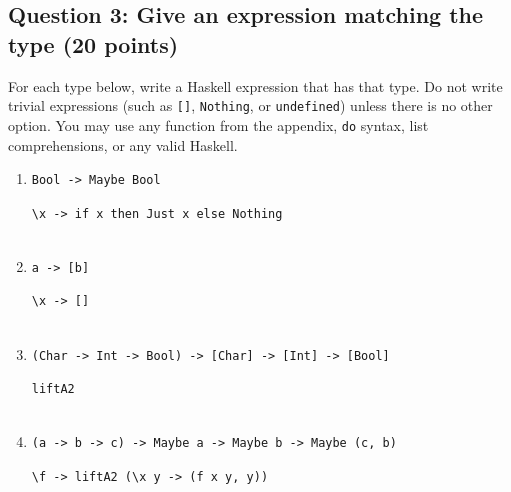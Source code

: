 \documentclass[11pt]{article}
\begin{document}
\subsection*{Question 3: Give an expression matching the type (20 points)}
For each type below, write a Haskell expression that has that type.
Do not write trivial expressions (such as \texttt{[]}, \texttt{Nothing},
or \texttt{undefined}) unless there is no other option. You may use any
function from the appendix, \texttt{do} syntax, list comprehensions,
or any valid Haskell.

\begin{enumerate}
\item
\begin{minipage}[t]{\linewidth}
\vspace{-\baselineskip}
\begin{lstlisting}
Bool -> Maybe Bool
\end{lstlisting}
\begin{lstlisting}[style=answer]
\x -> if x then Just x else Nothing


\end{lstlisting}
\end{minipage}

\item
\begin{minipage}[t]{\linewidth}
\vspace{-\baselineskip}
\begin{lstlisting}
a -> [b]
\end{lstlisting}
\begin{lstlisting}[style=answer]
\x -> []


\end{lstlisting}
\end{minipage}

\item
\begin{minipage}[t]{\linewidth}
\vspace{-\baselineskip}
\begin{lstlisting}
(Char -> Int -> Bool) -> [Char] -> [Int] -> [Bool]
\end{lstlisting}
\begin{lstlisting}[style=answer]
liftA2


\end{lstlisting}
\end{minipage}

\item
\begin{minipage}[t]{\linewidth}
\vspace{-\baselineskip}
\begin{lstlisting}
(a -> b -> c) -> Maybe a -> Maybe b -> Maybe (c, b)
\end{lstlisting}
\begin{lstlisting}[style=answer]
\f -> liftA2 (\x y -> (f x y, y))



\end{lstlisting}
\end{minipage}
\end{enumerate}
\end{document}
